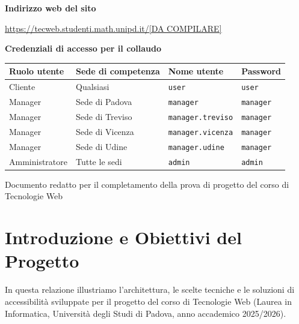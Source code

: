 \documentclass[a4paper,11pt]{article}
\begin{document}
\begin{titlepage}
    \vspace{0.6cm}

    \normalsize
    \textbf{Indirizzo web del sito} \par
    \vspace{0.1cm}
    \url{https://tecweb.studenti.math.unipd.it/[DA COMPILARE]} \par

    \vspace{0.6cm}

    \textbf{\large Credenziali di accesso per il collaudo} \par
    \vspace{0.2cm}
    \small
    \begin{tabular}{llll}
        \toprule
        \textbf{Ruolo utente} & \textbf{Sede di competenza} & \textbf{Nome utente} & \textbf{Password} \\
        \midrule
        Cliente & Qualsiasi & \texttt{user} & \texttt{user} \\
        Manager & Sede di Padova & \texttt{manager} & \texttt{manager} \\
        Manager & Sede di Treviso & \texttt{manager.treviso} & \texttt{manager} \\
        Manager & Sede di Vicenza & \texttt{manager.vicenza} & \texttt{manager} \\
        Manager & Sede di Udine & \texttt{manager.udine} & \texttt{manager} \\
        Amministratore & Tutte le sedi & \texttt{admin} & \texttt{admin} \\
        \bottomrule
    \end{tabular}

    \vfill
    {\footnotesize Documento redatto per il completamento della prova di progetto del corso di Tecnologie Web \par}
\end{titlepage}

\newpage
\tableofcontents
\newpage

\section{Introduzione e Obiettivi del Progetto}

In questa relazione illustriamo l'architettura, le scelte tecniche e le soluzioni di accessibilità sviluppate per il progetto del corso di Tecnologie Web (Laurea in Informatica, Università degli Studi di Padova, anno accademico 2025/2026).
\end{document}
